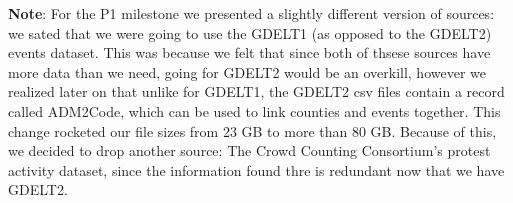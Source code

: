 \textbf{Note}: For the P1 milestone we presented a slightly
different version of sources: we sated that we were going to use
the GDELT1 (as opposed to the GDELT2) events dataset.
This was because we felt that since both of thsese sources have
more data than we need, going for GDELT2 would be an overkill,
however we realized later on that unlike for GDELT1,
the GDELT2 csv files contain a record called ADM2Code,
which can be used to link counties and events together.
This change rocketed our file sizes from 23 GB to more than
80 GB. Because of this, we decided to drop another source:
The Crowd Counting Consortium's protest activity dataset, since
the information found thre is redundant now that we have
GDELT2.
